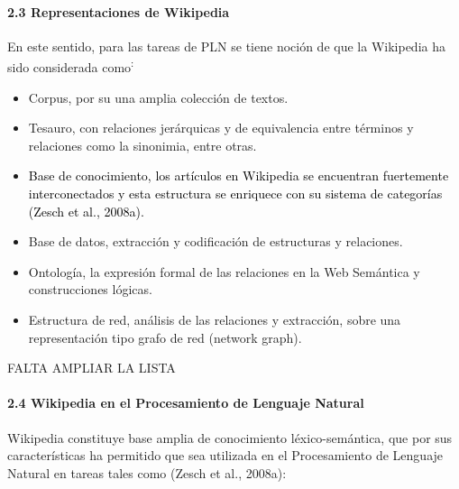 \documentclass[letterpaper]{article}
\newcommand\textstylebibuscitbase[1]{#1}
\newcommand\textstyleFootnoteSymbol[1]{\textsuperscript{#1}}
\newcommand\liststyleWWviiiNumvii{%
\renewcommand\labelitemi{{\textbullet}}
\renewcommand\labelitemii{{\textbullet}}
\renewcommand\labelitemiii{{\textbullet}}
\renewcommand\labelitemiv{{\textbullet}}
}
\begin{document}
\bigskip

\paragraph{2.3 Representaciones de Wikipedia}

\bigskip

{\sffamily
En este sentido, para las tareas de PLN se tiene noci\'on de que la
Wikipedia ha sido considerada como\textstyleFootnoteSymbol{:}}


\bigskip

\liststyleWWviiiNumvii
\begin{itemize}
\item {\sffamily
Corpus, por su una amplia colecci\'on de textos.}
\item {\sffamily
Tesauro, con relaciones jer\'arquicas y de equivalencia entre t\'erminos
y relaciones como la sinonimia, entre otras. }
\item {\sffamily
\textcolor{black}{Base de conocimiento, los art\'iculos en Wikipedia se
encuentran fuertemente interconectados y esta estructura se enriquece
con su sistema de categor\'ias
}\textstylebibuscitbase{\textcolor{black}{(Zesch et al.,
2008a)}}\textcolor{black}{.}}
\item {\sffamily
Base de datos, extracci\'on y codificaci\'on de estructuras y
relaciones.}
\item {\sffamily
Ontolog\'ia, la expresi\'on formal de las relaciones en la Web
Sem\'antica y construcciones l\'ogicas.}
\item {\sffamily
Estructura de red, an\'alisis de las relaciones y extracci\'on, sobre
una representaci\'on tipo grafo de red (network graph).}
\end{itemize}

\bigskip

{\centering{}\sffamily
FALTA AMPLIAR LA LISTA
\par}

\paragraph{2.4 Wikipedia en el Procesamiento de Lenguaje Natural}

\bigskip

{\sffamily
\textstylebibuscitbase{\foreignlanguage{spanish}{Wikipedia constituye
base amplia de conocimiento l\'exico-sem\'antica, que por sus
caracter\'isticas ha permitido que sea utilizada en el Procesamiento de
Lenguaje Natural en tareas tales como
}}\textstylebibuscitbase{\foreignlanguage{spanish}{(Zesch et al.,
2008a)}}\textstylebibuscitbase{\foreignlanguage{spanish}{:}}}
\end{document}
